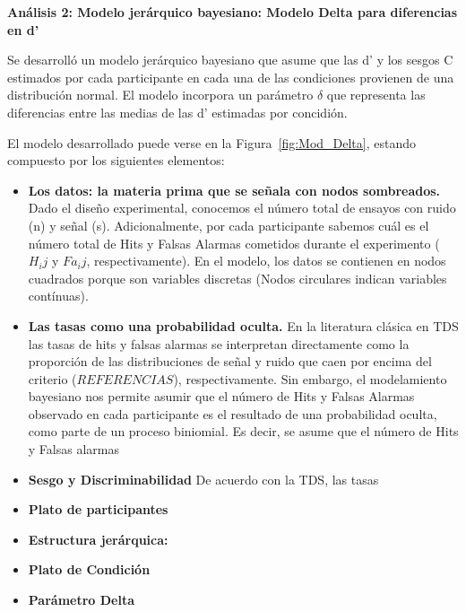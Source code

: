 \textbf{Análisis 2: Modelo jerárquico bayesiano: Modelo Delta para diferencias en d'}

Se desarrolló un modelo jerárquico bayesiano que asume que las d' y los sesgos C estimados por cada participante en cada una de las condiciones provienen de una distribución normal. El modelo incorpora un parámetro $\delta$ que representa las diferencias entre las medias de las d' estimadas por concidión.

El modelo desarrollado puede verse en la Figura~\ref{fig:Mod_Delta}, estando compuesto por los siguientes elementos:

\begin{itemize}
\item \textbf{Los datos: la materia prima que se señala con nodos sombreados.}
Dado el diseño experimental, conocemos el número total de ensayos con ruido (n) y señal (s). Adicionalmente, por cada participante sabemos cuál es el número total de Hits y Falsas Alarmas cometidos durante el experimento ($H_ij$ y $Fa_ij$, respectivamente). En el modelo, los datos se contienen en nodos cuadrados porque son variables discretas (Nodos circulares indican variables contínuas).\\

\item \textbf{Las tasas como una probabilidad oculta.} 
En la literatura clásica en TDS las tasas de hits y falsas alarmas se interpretan directamente como la proporción de las distribuciones de señal y ruido que caen por encima del criterio ($REFERENCIAS$), respectivamente. Sin embargo, el modelamiento bayesiano nos permite asumir que el número de Hits y Falsas Alarmas observado en cada participante es el resultado de una probabilidad oculta, como parte de un proceso biniomial. Es decir, se asume que el número de Hits y Falsas alarmas

\item \textbf{Sesgo y Discriminabilidad}
De acuerdo con la TDS, las tasas 

\item \textbf{Plato de participantes} 

\item \textbf{Estructura jerárquica:}

\item \textbf{Plato de Condición}

\item \textbf{Parámetro Delta}
\end{itemize} 

